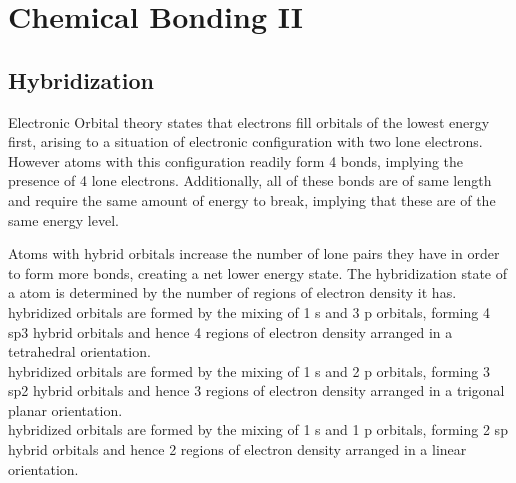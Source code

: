 \documentclass[../main]{subfiles}
\begin{document}
\section{Chemical Bonding II}

	\subsection{Hybridization}

	Electronic Orbital theory states that electrons fill orbitals of the lowest energy first, arising to a situation of electronic configuration  with two lone electrons. However atoms with this configuration readily form 4 bonds, implying the presence of 4 lone electrons. Additionally, all of these bonds are of same length and require the same amount of energy to break, implying that these are of the same energy level. \\


	\begin{center}  \end{center}


	Atoms with hybrid orbitals increase the number of lone pairs they have in order to form more bonds, creating a net lower energy state. The hybridization state of a atom is determined by the number of regions of electron density it has. \\

	 hybridized orbitals are formed by the mixing of 1 s and 3 p orbitals, forming 4 sp3 hybrid orbitals and hence 4 regions of electron density arranged in a tetrahedral orientation. \\

	 hybridized orbitals are formed by the mixing of 1 s and 2 p orbitals, forming 3 sp2 hybrid orbitals and hence 3 regions of electron density arranged in a trigonal planar orientation. \\

	 hybridized orbitals are formed by the mixing of 1 s and 1 p orbitals, forming 2 sp hybrid orbitals and hence 2 regions of electron density arranged in a linear orientation. \\
\end{document}
